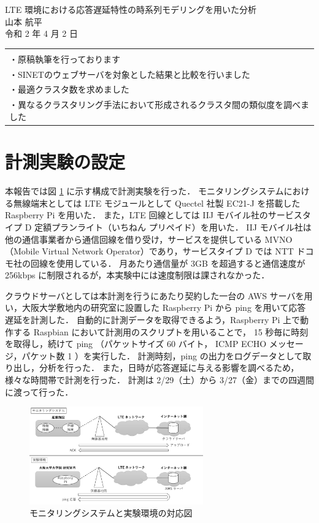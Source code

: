 \documentclass[a4j]{jarticle}
\begin{document}
\newcommand{\argmax}{\mathop{\rm arg~max}\limits}
\def \vector#1{\mbox{\boldmath $#1$}}
\begin{table}[t]
\begin{center}
{\Large LTE 環境における応答遅延特性の時系列モデリングを用いた分析}\\
山本 航平\\
令和 2 年 4 月 2 日
\end{center}
\vspace{1cm}
\begin{tabular}{l}
\hspace{0.5cm}{\large -進捗報告-}\\
・原稿執筆を行っております\\
・SINETのウェブサーバを対象とした結果と比較を行いました\\
・最適クラスタ数を求めました\\
・異なるクラスタリング手法において形成されるクラスタ間の類似度を調べました\\
\end{tabular}
\end{table}

\section{計測実験の設定}
本報告では図 \ref{exp} に示す構成で計測実験を行った．
モニタリングシステムにおける無線端末としては LTE モジュールとして Quectel 社製 EC21-J を搭載した Raspberry Pi を用いた．
また，LTE 回線としては IIJ モバイル社のサービスタイプ D 定額プランライト（いちねん プリペイド）を用いた．
IIJ モバイル社は他の通信事業者から通信回線を借り受け，サービスを提供している MVNO（Mobile Virtual Network Operator）であり，サービスタイプ D では NTT ドコモ社の回線を使用している．
月あたり通信量が 3GB を超過すると通信速度が 256kbps に制限されるが，本実験中には速度制限は課されなかった．

クラウドサーバとしては本計測を行うにあたり契約した一台の AWS サーバを用い，大阪大学敷地内の研究室に設置した Raspberry Pi から ping を用いて応答遅延を計測した．
自動的に計測データを取得できるよう，Raspberry Pi 上で動作する Raspbian において計測用のスクリプトを用いることで， 15 秒毎に時刻を取得し，続けて ping （パケットサイズ 60 バイト， ICMP ECHO メッセージ，パケット数 1 ）を実行した．
計測時刻，ping の出力をログデータとして取り出し，分析を行った．
また，日時が応答遅延に与える影響を調べるため，様々な時間帯で計測を行った．
計測は 2/29（土）から 3/27（金）までの四週間に渡って行った．
\begin{figure}[tb]
\centering
\includegraphics[width=7.5cm]{../figure/experiment.pdf}
\caption{モニタリングシステムと実験環境の対応図}
\label{exp}
\end{figure}
\end{document}
